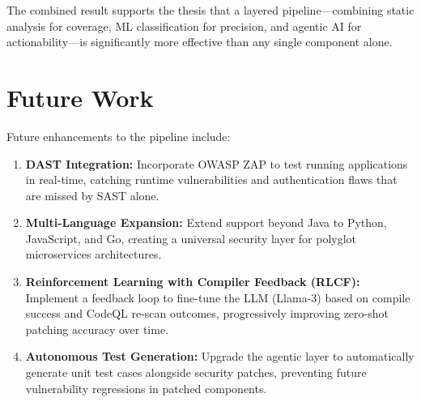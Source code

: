 The combined result supports the thesis that a layered pipeline---combining static
analysis for coverage, ML classification for precision, and agentic AI for
actionability---is significantly more effective than any single component alone.

\section{Future Work}

Future enhancements to the pipeline include:
\begin{enumerate}
  \item \textbf{DAST Integration:} Incorporate OWASP ZAP to test running applications
        in real-time, catching runtime vulnerabilities and authentication flaws that
        are missed by SAST alone.

  \item \textbf{Multi-Language Expansion:} Extend support beyond Java to Python,
        JavaScript, and Go, creating a universal security layer for polyglot
        microservices architectures.

  \item \textbf{Reinforcement Learning with Compiler Feedback (RLCF):} Implement a
        feedback loop to fine-tune the LLM (Llama-3) based on compile success and
        CodeQL re-scan outcomes, progressively improving zero-shot patching accuracy
        over time.

  \item \textbf{Autonomous Test Generation:} Upgrade the agentic layer to
        automatically generate unit test cases alongside security patches, preventing
        future vulnerability regressions in patched components.
\end{enumerate}
